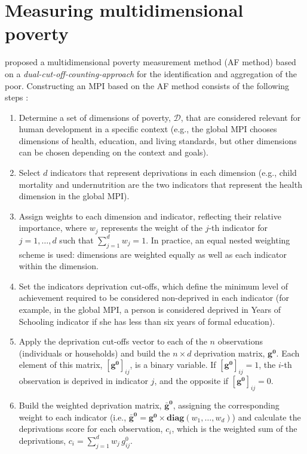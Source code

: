 \section{Measuring multidimensional poverty}\label{measuring-multidimensional-poverty}

\citet{alkire2011} proposed a multidimensional poverty measurement method (AF method) based on a \emph{dual-cut-off-counting-approach} for the identification and aggregation of the poor. Constructing an MPI based on the AF method consists of the following steps \citep{alkire2015multidimensional}:

\begin{enumerate}
\def\labelenumi{\arabic{enumi}.}
\item
  Determine a set of dimensions of poverty, \(\mathcal{D}\), that are considered relevant for human development in a specific context (e.g., the global MPI chooses dimensions of health, education, and living standards, but other dimensions can be chosen depending on the context and goals).
\item
  Select \(d\) indicators that represent deprivations in each dimension (e.g., child mortality and undernutrition are the two indicators that represent the health dimension in the global MPI).
\item
  Assign weights to each dimension and indicator, reflecting their relative importance, where \(w_j\) represents the weight of the \(j\)-th indicator for \(j = 1,\ldots,d\) such that \(\sum_{j=1}^d w_j = 1\). In practice, an equal nested weighting scheme is used: dimensions are weighted equally as well as each indicator within the dimension.
\item
  Set the indicators deprivation cut-offs, which define the minimum level of achievement required to be considered non-deprived in each indicator (for example, in the global MPI, a person is considered deprived in Years of Schooling indicator if she has less than six years of formal education).
\item
  Apply the deprivation cut-offs vector to each of the \(n\) observations (individuals or households) and build the \(n \times d\) deprivation matrix, \(\mathbf{g^0}\). Each element of this matrix, \(\left[ \mathbf{g^0} \right]_{ij}\), is a binary variable. If \(\left[ \mathbf{g^0} \right]_{ij} = 1\), the \(i\)-th observation is deprived in indicator \(j\), and the opposite if \(\left[ \mathbf{g^0} \right]_{ij} = 0\).
\item
  Build the weighted deprivation matrix, \(\mathbf{\bar{g}^0}\), assigning the corresponding weight to each indicator (i.e., \(\mathbf{\bar{g}^0} = \mathbf{g^0} \times \textbf{diag}(w_1,\ldots,w_d)\)) and calculate the deprivations score for each observation, \(c_i\), which is the weighted sum of the deprivations, \(c_{i} = \sum_{j=1}^d w_j \, g^0_{ij}\).

\end{enumerate}
